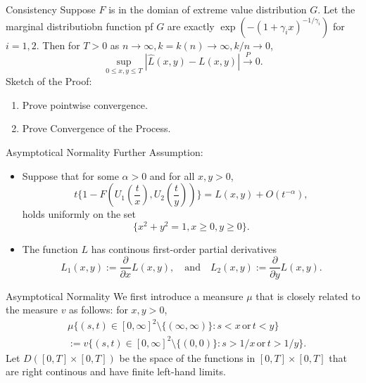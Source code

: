 \documentclass[11pt]{beamer}
\begin{document}
\begin{frame}{Consistency}
Suppose $F$ is in the domian of extreme value distribution $G$. Let the marginal distributiobn function pf $G$ are exactly $\exp(-(1+\gamma_i x)^{-1/\gamma_i})$ for $i=1,2.$ Then for $T>0$ as $n\to \infty, k=k(n)\to \infty,k/n\to 0$,
\begin{displaymath}
\sup_{0\le x,y\le T}  |\hat{L}(x,y)-L(x,y)|\stackrel{P}{\to}0.
\end{displaymath}
Sketch of the Proof:
\begin{enumerate}
\item Prove pointwise convergence.
\item Prove Convergence of the Process.
\end{enumerate}
\end{frame}

\begin{frame}{Asymptotical Normality}
Further Assumption:
\begin{itemize}
\item Suppose that for some $\alpha>0$ and for all $x,y>0$,
\begin{equation}\label{7.2.8}
t \{ 1-F(U_1(\frac{t}{x}),U_2(\frac{t}{y}))\}=L(x,y)+O(t^{-\alpha}),\tag{7.2.8}
\end{equation}
holds uniformly on the set 
\begin{displaymath}
\{x^2+y^2=1,x\ge 0, y\ge 0 \}.
\end{displaymath}
\item The function $L$ has continous first-order partial derivatives 
\begin{displaymath}
L_1(x,y):=\frac{\partial}{\partial x} L(x,y), \quad \text{and} \quad L_2(x,y):=\frac{\partial}{\partial y}L(x,y).
\end{displaymath}
\end{itemize}
\end{frame}
\begin{frame}{Asymptotical Normality}
We first introduce a meansure $\mu$ that is closely related to the measure $v$ as follows: for $x,y>0$,
\begin{displaymath}
\begin{split}
&\mu\{(s,t)\in [0,\infty]^2   \setminus \{(\infty,\infty) \} : s<x\, \text{or}\, t<y\} \\
& :=v\{ (s,t)\in [0,\infty]^2\setminus \{ (0,0)\}: s>1/x \, \text{or} \, t>1/y\}.
\end{split}
\end{displaymath}
Let $D([0,T]\times[0,T])$ be the space of the functions in $[0,T]\times[0,T]$ that are right continous and have finite left-hand limits.
\end{frame}
\end{document}
